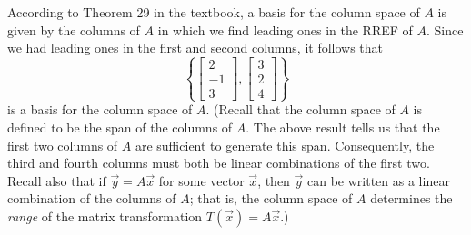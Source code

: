\documentclass[12pt]{article}
\newcommand{\bbm}{\begin{bmatrix}}
\newcommand{\ebm}{\end{bmatrix}}
\begin{document}
\begin{enumerate}
According to Theorem 29 in the textbook, a basis for the column space of $A$ is given by the columns of $A$ in which we find leading ones in the RREF of $A$. Since we had leading ones in the first and second columns, it follows that
\[
 \left\{\bbm 2\\-1\\3\ebm, \bbm 3\\2\\4\ebm\right\}
\]
is a basis for the column space of $A$. (Recall that the column space of $A$ is defined to be the span of the columns of $A$. The above result tells us that the first two columns of $A$ are sufficient to generate this span. Consequently, the third and fourth columns must both be linear combinations of the first two. Recall also that if $\vec{y}=A\vec{x}$ for some vector $\vec{x}$, then $\vec{y}$ can be written as a linear combination of the columns of $A$; that is, the column space of $A$ determines the \textit{range} of the matrix transformation $T(\vec{x}) = A\vec{x}$.)
 \end{enumerate}
\end{document}
